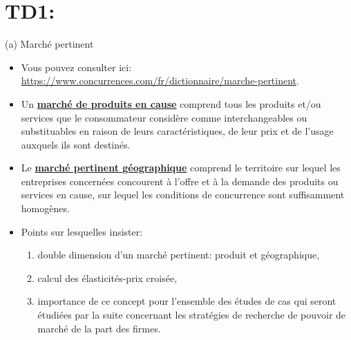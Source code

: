 \begin{frame}
\titlepage
\end{frame}
\begin{frame}
 \tableofcontents
    \end{frame}



\section{TD1: \cite{ArquieBertin2020}}
\frame{\sectionpage}
\begin{frame}[allowframebreaks]{(a) Marché pertinent}
\begin{itemize}
\item Vous pouvez consulter ici: 
    \url{https://www.concurrences.com/fr/dictionnaire/marche-pertinent}. 
\item Un \textbf{\underline{marché de produits en cause}} comprend tous les produits et/ou services 
que le consommateur considère comme interchangeables ou substituables 
en raison de leurs caractéristiques, de leur prix et de l’usage auxquels ils sont destinés.
\item Le \textbf{\underline{marché pertinent géographique}} comprend 
le territoire sur lequel les entreprises concernées concourent à l’offre et à 
la demande des produits ou services en cause, sur lequel les conditions de concurrence 
sont suffisamment homogènes.

\framebreak

\item Points sur lesquelles insister: 
\begin{enumerate}[-]
\item double dimension d’un marché pertinent: produit et géographique,
\item calcul des élasticités-prix croisée,
\item importance de ce concept pour l’ensemble des études de cas qui seront étudiées 
par la suite concernant les stratégies de recherche de pouvoir de marché de la part des firmes. 
\end{enumerate}
\end{itemize}
\end{frame}

